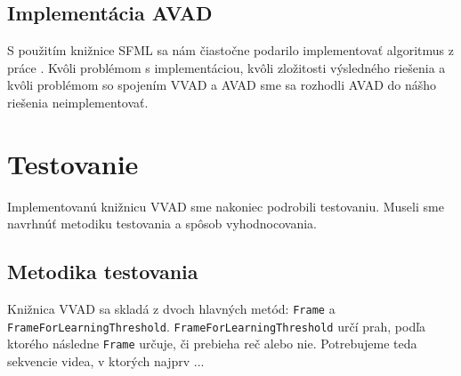 \section{Implementácia AVAD}
S použitím knižnice SFML \cite{SFML} sa nám čiastočne podarilo implementovať algoritmus z práce  \cite{moattar2009simple}. 
Kvôli problémom s implementáciou, kvôli zložitosti výsledného riešenia a kvôli problémom so spojením VVAD a AVAD sme sa rozhodli AVAD do nášho riešenia neimplementovať.

\chapter{Testovanie}
Implementovanú knižnicu VVAD sme nakoniec podrobili testovaniu.
Museli sme navrhnúť metodiku testovania a spôsob vyhodnocovania. 

\section{Metodika testovania}
Knižnica VVAD sa skladá z dvoch hlavných metód: \texttt{Frame} a \texttt{FrameForLearningThreshold}. 
\texttt{FrameForLearningThreshold} určí prah, podľa ktorého následne \texttt{Frame} určuje, či prebieha reč alebo nie.
Potrebujeme teda sekvencie videa, v ktorých najprv ...
